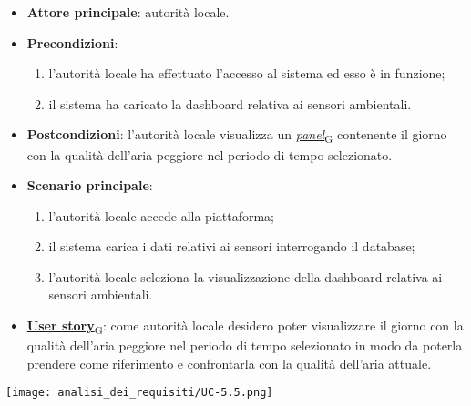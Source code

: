 \begin{itemize}
	\item \textbf{Attore principale}: autorità locale.
	\item \textbf{Precondizioni}:
	      \begin{enumerate}
		      \item l'autorità locale ha effettuato l'accesso al sistema ed esso è in funzione;
		      \item il sistema ha caricato la dashboard relativa ai sensori ambientali.
	      \end{enumerate}
	\item \textbf{Postcondizioni}: l'autorità locale visualizza un \href{https://7last.github.io/docs/pb/documentazione-interna/glossario\#panel}{\textit{panel}\textsubscript{G}} contenente il giorno con la qualità dell'aria peggiore nel periodo di tempo selezionato.
	\item \textbf{Scenario principale}:
	      \begin{enumerate}
		      \item l'autorità locale accede alla piattaforma;
		      \item il sistema carica i dati relativi ai sensori interrogando il database;
		      \item l'autorità locale seleziona la visualizzazione della dashboard relativa ai sensori ambientali.
	      \end{enumerate}
	\item \href{https://7last.github.io/docs/pb/documentazione-interna/glossario\#user-story}{\textbf{User story}\textsubscript{G}}:
	      come autorità locale desidero poter visualizzare il giorno con la qualità dell'aria peggiore nel periodo di tempo selezionato
	      in modo da poterla prendere come riferimento e confrontarla con la qualità dell'aria attuale.
\end{itemize}
\begin{center}
	\texttt{[image: analisi\_dei\_requisiti/UC-5.5.png]}
\end{center}


